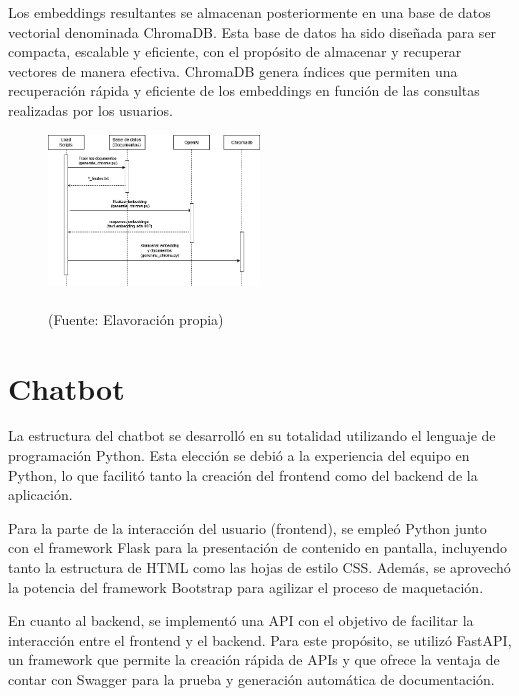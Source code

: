 \par Los embeddings resultantes se almacenan posteriormente en una base de datos vectorial denominada ChromaDB. Esta base de 
datos ha sido diseñada para ser compacta, escalable y eficiente, con el propósito de almacenar y recuperar vectores de manera 
efectiva. ChromaDB genera índices que permiten una recuperación rápida y eficiente de los embeddings en función de las 
consultas realizadas por los usuarios\cite{langchain1}.


\begin{figure}[ht!]
    \centering
    \includegraphics[width=0.5\textwidth]{figures/load_diagram.png}
    \caption[]{\\
    {\scriptsize (Fuente: Elavoración propia)}}
    \label{fig:chatbot1}
\end{figure}

\newpage
\section{Chatbot}

   
La estructura del chatbot se desarrolló en su totalidad utilizando el lenguaje de programación Python. Esta elección se debió a la 
experiencia del equipo en Python, lo que facilitó tanto la creación del frontend como del backend de la aplicación.

Para la parte de la interacción del usuario (frontend), se empleó Python junto con el framework Flask para la presentación 
de contenido en pantalla, incluyendo tanto la estructura de HTML como las hojas de estilo CSS. Además, se aprovechó la potencia del 
framework Bootstrap para agilizar el proceso de maquetación.

En cuanto al backend, se implementó una API con el objetivo de facilitar la interacción entre el frontend y el backend. Para este 
propósito, se utilizó FastAPI, un framework que permite la creación rápida de APIs y que ofrece la ventaja de contar con Swagger 
para la prueba y generación automática de documentación.

